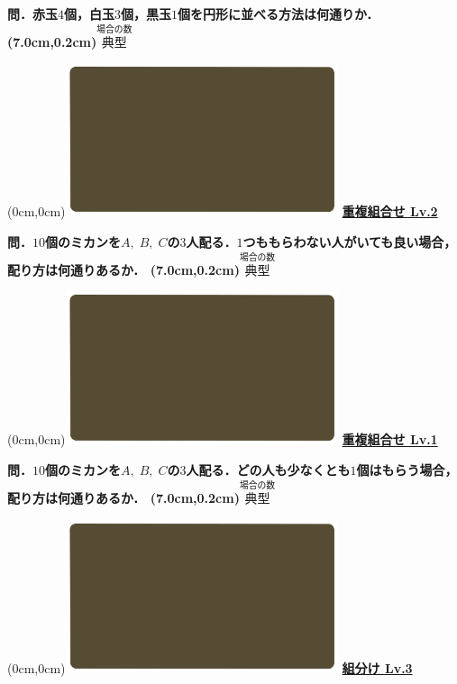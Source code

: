 \documentclass[10pt,
fleqn,
dvipdfmx,
uplatex
]{jsarticle}
\begin{document}
\huge 
\bf\boldmath 問．赤玉$4$個，白玉$3$個，黒玉$1$個を円形に並べる方法は何通りか．
\at(7.0cm,0.2cm){\small\color{bradorange}$\overset{\text{場合の数}}{\text{典型}}$}


\newpage



\at(0cm,0cm){\includegraphics[width=8cm,bb=0 0 1920 1080]{./youtube/thumbnails/templates/smart_background/場合の数.jpeg}}
{\color{orange}\bf\boldmath\LARGE\underline{重複組合せ Lv.2 }}\vspace{0.3zw}

\Large 
\bf\boldmath 問．${10}$個のミカンを$A,\;B,\;C$の$3$人配る．$1$つももらわない人がいても良い場合，配り方は何通りあるか．
\at(7.0cm,0.2cm){\small\color{bradorange}$\overset{\text{場合の数}}{\text{典型}}$}


\newpage



\at(0cm,0cm){\includegraphics[width=8cm,bb=0 0 1920 1080]{./youtube/thumbnails/templates/smart_background/場合の数.jpeg}}
{\color{orange}\bf\boldmath\LARGE\underline{重複組合せ Lv.1 }}\vspace{0.3zw}

\Large 
\bf\boldmath 問．${10}$個のミカンを$A,\;B,\;C$の$3$人配る．どの人も少なくとも$1$個はもらう場合，配り方は何通りあるか．
\at(7.0cm,0.2cm){\small\color{bradorange}$\overset{\text{場合の数}}{\text{典型}}$}


\newpage



\at(0cm,0cm){\includegraphics[width=8cm,bb=0 0 1920 1080]{./youtube/thumbnails/templates/smart_background/場合の数.jpeg}}
{\color{orange}\bf\boldmath\huge\underline{組分け Lv.3 }}\vspace{0.3zw}
\end{document}

